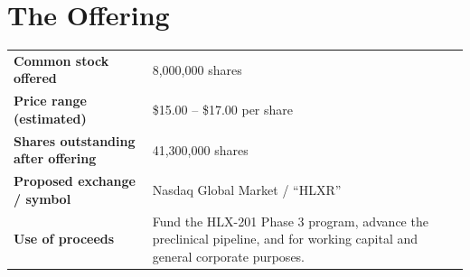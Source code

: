 \section{The Offering}
\begin{tabularx}{\linewidth}{@{}>{\bfseries}p{5.2cm} X@{}}
Common stock offered & 8,000,000 shares\\
Price range (estimated) & \$15.00 -- \$17.00 per share\\
Shares outstanding after offering & 41,300,000 shares\\
Proposed exchange / symbol & Nasdaq Global Market / ``HLXR''\\
Use of proceeds & Fund the HLX-201 Phase 3 program, advance the preclinical
pipeline, and for working capital and general corporate purposes.\\
\end{tabularx}
